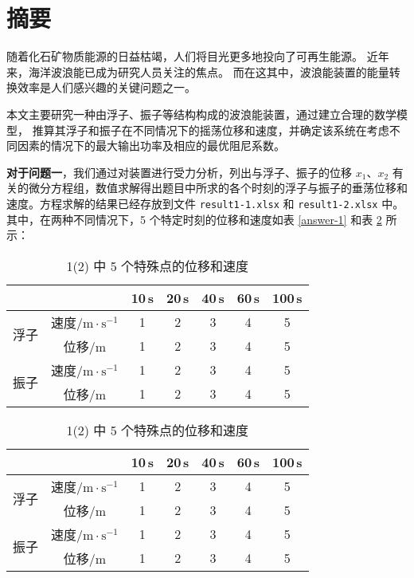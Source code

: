 \section*{摘要}
随着化石矿物质能源的日益枯竭，人们将目光更多地投向了可再生能源。
近年来，海洋波浪能已成为研究人员关注的焦点。
而在这其中，波浪能装置的能量转换效率是人们感兴趣的关键问题之一。

本文主要研究一种由浮子、振子等结构构成的波浪能装置，通过建立合理的数学模型，
推算其浮子和振子在不同情况下的摇荡位移和速度，并确定该系统在考虑不同因素的情况下的最大输出功率及相应的最优阻尼系数。

\textbf{对于问题一}，我们通过对装置进行受力分析，列出与浮子、振子的位移 $x_1$、$x_2$ 有关的微分方程组，数值求解得出题目中所求的各个时刻的浮子与振子的垂荡位移和速度。方程求解的结果已经存放到文件 \verb|result1-1.xlsx| 和 \verb|result1-2.xlsx| 中。
其中，在两种不同情况下，5 个特定时刻的位移和速度如表 \ref{answer-1} 和表 \ref{answer-2} 所示：

\begin{table}[htbp]
    \centering
    \scriptsize
    \begin{minipage}[t]{0.48\textwidth}
        \centering
        \begin{tabular}{ccccccc}
            \toprule
            & & 10\,s & 20\,s & 40\,s & 60\,s & 100\,s \\
            \midrule
            \multirow{2}{*}{浮子} & 速度/$\mathrm{m}\cdot\mathrm{s}^{-1}$ & 1 & 2 & 3 & 4 & 5 \\
            & 位移/$\mathrm{m}$ & 1 & 2 & 3 & 4 & 5 \\
            \multirow{2}{*}{振子} & 速度/$\mathrm{m}\cdot\mathrm{s}^{-1}$ & 1 & 2 & 3 & 4 & 5 \\
            & 位移/$\mathrm{m}$ & 1 & 2 & 3 & 4 & 5 \\
            \bottomrule
        \end{tabular}
    \caption{1(1) 中 5 个特殊点的位移和速度}
    \label{answer-1}
    \end{minipage}
    \begin{minipage}[t]{0.48\textwidth}
        \centering
        \begin{tabular}{ccccccc}
            \toprule
            & & 10\,s & 20\,s & 40\,s & 60\,s & 100\,s \\
            \midrule
            \multirow{2}{*}{浮子} & 速度/$\mathrm{m}\cdot\mathrm{s}^{-1}$ & 1 & 2 & 3 & 4 & 5 \\
            & 位移/$\mathrm{m}$ & 1 & 2 & 3 & 4 & 5 \\
            \multirow{2}{*}{振子} & 速度/$\mathrm{m}\cdot\mathrm{s}^{-1}$ & 1 & 2 & 3 & 4 & 5 \\
            & 位移/$\mathrm{m}$ & 1 & 2 & 3 & 4 & 5 \\
            \bottomrule
        \end{tabular}
    \caption{1(2) 中 5 个特殊点的位移和速度}
    \label{answer-2}
    \end{minipage}
\end{table}

